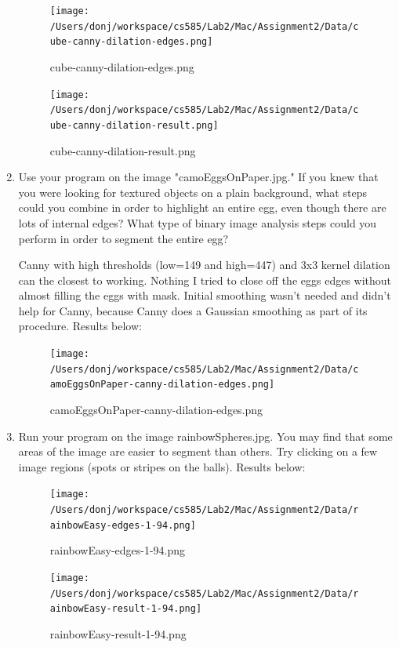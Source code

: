 \documentclass{article}
\begin{document}
\begin{enumerate}
\begin{figure}[H]
\centering
\texttt{[image: /Users/donj/workspace/cs585/Lab2/Mac/Assignment2/Data/cube-canny-dilation-edges.png]}
\caption{cube-canny-dilation-edges.png}
\label{overflow}
\end{figure}

\begin{figure}[H]
\centering
\texttt{[image: /Users/donj/workspace/cs585/Lab2/Mac/Assignment2/Data/cube-canny-dilation-result.png]}
\caption{cube-canny-dilation-result.png}
\label{overflow}
\end{figure}

\pagebreak
\item
Use your program on the image "camoEggsOnPaper.jpg." If you knew that you were looking for textured objects on a plain background, what steps could you combine in order to highlight an entire egg, even though there are lots of internal edges? What type of binary image analysis steps could you perform in order to segment the entire egg? 

Canny with high thresholds (low=149 and high=447) and 3x3 kernel dilation can the closest to working. Nothing I tried to close off the eggs edges without almost filling the eggs with mask. Initial smoothing wasn't needed and didn't help for Canny, because Canny does a Gaussian smoothing as part of its procedure. Results below:

\begin{figure}[H]
\centering
\texttt{[image: /Users/donj/workspace/cs585/Lab2/Mac/Assignment2/Data/camoEggsOnPaper-canny-dilation-edges.png]}
\caption{camoEggsOnPaper-canny-dilation-edges.png}
\label{overflow}
\end{figure}


\item
Run your program on the image rainbowSpheres.jpg. You may find that some areas of the image are easier to segment than others. Try clicking on a few image regions (spots or stripes on the balls). Results below:

\begin{figure}[H]
\centering
\texttt{[image: /Users/donj/workspace/cs585/Lab2/Mac/Assignment2/Data/rainbowEasy-edges-1-94.png]}
\caption{rainbowEasy-edges-1-94.png}
\label{overflow}
\end{figure}

\begin{figure}[H]
\centering
\texttt{[image: /Users/donj/workspace/cs585/Lab2/Mac/Assignment2/Data/rainbowEasy-result-1-94.png]}
\caption{rainbowEasy-result-1-94.png}
\label{overflow}
\end{figure}



\end{enumerate}
\end{document}
